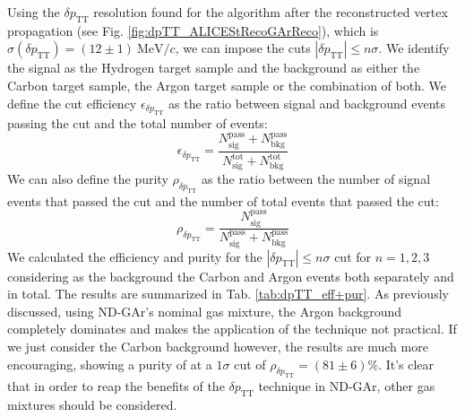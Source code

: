 Using the $\delta p_\text{TT}$ resolution found for the  algorithm after the reconstructed vertex propagation (see Fig. \ref{fig:dpTT_ALICEStRecoGArReco}), which is $\sigma(\delta p_\text{TT})=(12\pm1)\ \text{MeV}/c$, we can impose the cuts $|\delta p_\text{TT}|\leq n\sigma$. We identify the signal as the Hydrogen target sample and the background as either the Carbon target sample, the Argon target sample or the combination of both. We define the cut efficiency $\epsilon_{\delta p_\text{TT}}$ as the ratio between signal and background events passing the cut and the total number of events:
\begin{equation}
    \epsilon_{\delta p_\text{TT}} = \frac{N_\text{sig}^\text{pass}+N_\text{bkg}^\text{pass}}{N_\text{sig}^\text{tot}+N_\text{bkg}^\text{tot}}
\end{equation}
We can also define the purity $\rho_{\delta p_\text{TT}}$ as the ratio between the number of signal events that passed the cut and the number of total events that passed the cut:
\begin{equation}
    \rho_{\delta p_\text{TT}} = \frac{N_\text{sig}^\text{pass}}{N_\text{sig}^\text{pass}+N_\text{bkg}^\text{pass}}
\end{equation}
We calculated the efficiency and purity for the $|\delta p_\text{TT}|\leq n\sigma$ cut for $n=1,2,3$ considering as the background the Carbon and Argon events both separately and in total. The results are summarized in Tab. \ref{tab:dpTT_eff+pur}. As previously discussed, using ND-GAr's nominal gas mixture, the Argon background completely dominates and makes the application of the technique not practical. If we just consider the Carbon background however, the results are much more encouraging, showing a purity of at a $1\sigma$ cut of $\rho_{\delta p_\text{TT}}=(81\pm6)\%$. It's clear that in order to reap the benefits of the $\delta p_\text{TT}$ technique in ND-GAr, other gas mixtures should be considered. 



